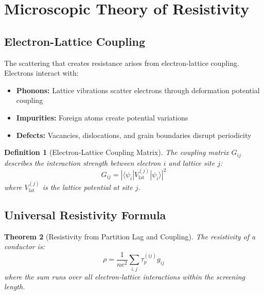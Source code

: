 \documentclass[twocolumn,showpacs,preprintnumbers,amsmath,amssymb,prd]{revtex4-2}
\newtheorem{theorem}{Theorem}[section]
\newtheorem{definition}[theorem]{Definition}
\newcommand{\taup}{\tau_p}
\begin{document}
\section{Microscopic Theory of Resistivity}
\label{sec:resistivity}

\subsection{Electron-Lattice Coupling}

The scattering that creates resistance arises from electron-lattice coupling. Electrons interact with:
\begin{itemize}
\item \textbf{Phonons:} Lattice vibrations scatter electrons through deformation potential coupling
\item \textbf{Impurities:} Foreign atoms create potential variations
\item \textbf{Defects:} Vacancies, dislocations, and grain boundaries disrupt periodicity
\end{itemize}

\begin{definition}[Electron-Lattice Coupling Matrix]
\label{def:coupling_matrix}
The coupling matrix $G_{ij}$ describes the interaction strength between electron $i$ and lattice site $j$:
\begin{equation}
G_{ij} = |\langle \psi_i | V_{\text{lat}}^{(j)} | \psi_i \rangle|^2
\label{eq:coupling_matrix}
\end{equation}
where $V_{\text{lat}}^{(j)}$ is the lattice potential at site $j$.
\end{definition}

\subsection{Universal Resistivity Formula}

\begin{theorem}[Resistivity from Partition Lag and Coupling]
\label{thm:resistivity_universal}
The resistivity of a conductor is:
\begin{equation}
\rho = \frac{1}{ne^2} \sum_{i,j} \taup^{(ij)} g_{ij}
\label{eq:resistivity_universal}
\end{equation}
where the sum runs over all electron-lattice interactions within the screening length.
\end{theorem}
\end{document}
